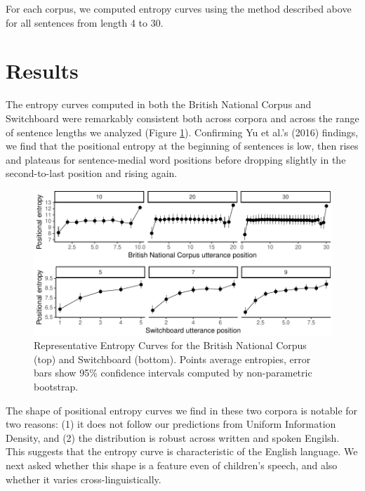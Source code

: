 \documentclass[10pt, letterpaper]{article}
\newenvironment{CodeChunk}{}{}
\begin{document}
For each corpus, we computed entropy curves using the method described
above for all sentences from length 4 to 30.

\hypertarget{results}{%
\section{Results}\label{results}}

The entropy curves computed in both the British National Corpus and
Switchboard were remarkably consistent both across corpora and across
the range of sentence lengths we analyzed (Figure
\ref{fig:read_and_plot_exp1}). Confirming Yu et al.'s (2016) findings,
we find that the positional entropy at the beginning of sentences is
low, then rises and plateaus for sentence-medial word positions before
dropping slightly in the second-to-last position and rising again.

\begin{CodeChunk}
\begin{figure}[tb]

{\centering \includegraphics{figs/read_and_plot_exp1-1} 

}

\caption[Representative Entropy Curves for the British National Corpus (top) and Switchboard (bottom)]{Representative Entropy Curves for the British National Corpus (top) and Switchboard (bottom). Points average entropies, error bars show 95\% confidence intervals computed by non-parametric bootstrap.}\label{fig:read_and_plot_exp1}
\end{figure}
\end{CodeChunk}

The shape of positional entropy curves we find in these two corpora is
notable for two reasons: (1) it does not follow our predictions from
Uniform Information Density, and (2) the distribution is robust across
written and spoken Engilsh. This suggests that the entropy curve is
characteristic of the English language. We next asked whether this shape
is a feature even of children's speech, and also whether it varies
cross-linguistically.
\end{document}
